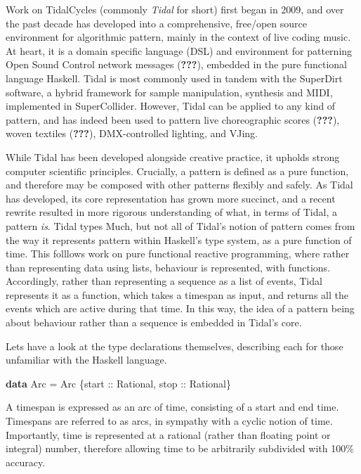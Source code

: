 \documentclass[
]{article}
\newenvironment{Shaded}{\begin{snugshade}}{\end{snugshade}}
\newcommand{\DataTypeTok}[1]{\textcolor[rgb]{0.13,0.29,0.53}{#1}}
\newcommand{\KeywordTok}[1]{\textcolor[rgb]{0.13,0.29,0.53}{\textbf{#1}}}
\newcommand{\NormalTok}[1]{#1}
\newcommand{\OtherTok}[1]{\textcolor[rgb]{0.56,0.35,0.01}{#1}}
\begin{document}
Work on TidalCycles (commonly \emph{Tidal} for short) first began in
2009, and over the past decade has developed into a comprehensive,
free/open source environment for algorithmic pattern, mainly in the
context of live coding music. At heart, it is a domain specific language
(DSL) and environment for patterning Open Sound Control network messages
({\textbf{???}}), embedded in the pure functional language Haskell.
Tidal is most commonly used in tandem with the SuperDirt software, a
hybrid framework for sample manipulation, synthesis and MIDI,
implemented in SuperCollider. However, Tidal can be applied to any kind
of pattern, and has indeed been used to pattern live choreographic
scores ({\textbf{???}}), woven textiles ({\textbf{???}}), DMX-controlled
lighting, and VJing.

While Tidal has been developed alongside creative practice, it upholds
strong computer scientific principles. Crucially, a pattern is defined
as a pure function, and therefore may be composed with other patterns
flexibly and safely. As Tidal has developed, its core representation has
grown more succinct, and a recent rewrite resulted in more rigorous
understanding of what, in terms of Tidal, a pattern \emph{is}. Tidal
types Much, but not all of Tidal's notion of pattern comes from the way
it represents pattern within Haskell's type system, as a pure function
of time. This folllows work on pure functional reactive programming,
where rather than representing data using lists, behaviour is
represented, with functions. Accordingly, rather than representing a
sequence as a list of events, Tidal represents it as a function, which
takes a timespan as input, and returns all the events which are active
during that time. In this way, the idea of a pattern being about
behaviour rather than a sequence is embedded in Tidal's core.

Lets have a look at the type declarations themselves, describing each
for those unfamiliar with the Haskell language.

\begin{Shaded}
\begin{Highlighting}[]
\KeywordTok{data} \DataTypeTok{Arc} \OtherTok{=} \DataTypeTok{Arc}\NormalTok{ \{}\OtherTok{start ::} \DataTypeTok{Rational}\NormalTok{,}\OtherTok{ stop ::} \DataTypeTok{Rational}\NormalTok{\}}
\end{Highlighting}
\end{Shaded}

A timespan is expressed as an arc of time, consisting of a start and end
time. Timespans are referred to as arcs, in sympathy with a cyclic
notion of time. Importantly, time is represented at a rational (rather
than floating point or integral) number, therefore allowing time to be
arbitrarily subdivided with 100\% accuracy.
\end{document}
